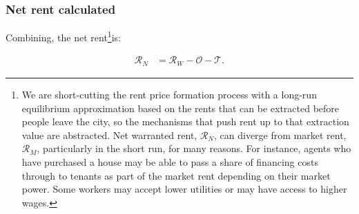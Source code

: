 \subsubsection{Net rent calculated}
Combining, the \gls{net rent}\footnote{We are short-cutting the rent price formation process with a long-run equilibrium approximation based on the rents that can be extracted before people leave the city, so the mechanisms that push rent up to that extraction value are abstracted. Net warranted rent, $\mathcal{R}_N$, can diverge from market rent, $\mathcal{R}_M$, particularly in the short run, for many reasons. For instance, agents who have purchased a house may be able to pass a share of financing costs through to tenants as part of the market rent depending on their market power. Some workers may accept lower utilities or may have access to higher wages. %
% 
}is:

\begin{align}
\mathcal{R}_N &= \mathcal{R}_W - \mathcal{O} - \mathcal{T}.
\end{align}

